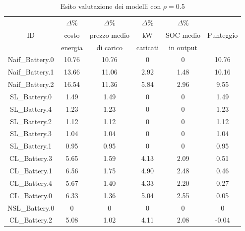 \documentclass[italian, Lau, oneside]{sapthesis}
\begin{document}
\begin{table}[h]
    \center
    \caption{Esito valutazione dei modelli con $\rho = 0.5$}
    \label{tab:scen2}
    \begin{tabular}{c|c|c|c|c|c}
        \hline
        \hline
                & $\Delta \%$   & $\Delta \%$   & $\Delta \%$   & $\Delta \%$   &\\
        ID      & costo         & prezzo medio  & kW            & SOC medio     & Punteggio\\
                & energia       & di carico     & caricati      & in output     & \\

        \hline
        Naif\_Battery.0     & 10.76     & 10.76     & 0     & 0     & 10.76     \\
        \hline
        Naif\_Battery.1     & 13.66     & 11.06     & 2.92  & 1.48  & 10.16     \\
        \hline
        Naif\_Battery.2     & 16.54     & 11.36     & 5.84  & 2.96  & 9.55     \\
        \hline
        SL\_Battery.0       & 1.49      & 1.49      & 0     & 0     & 1.49      \\
        \hline
        SL\_Battery.4       & 1.23      & 1.23      & 0     & 0     & 1.23      \\
        \hline
        SL\_Battery.2       & 1.12      & 1.12      & 0     & 0     & 1.12      \\
        \hline
        SL\_Battery.3       & 1.04      & 1.04      & 0     & 0     & 1.04      \\
        \hline
        SL\_Battery.1       & 0.95      & 0.95      & 0     & 0     & 0.95      \\
        \hline
        CL\_Battery.3       & 5.65      & 1.59      & 4.13  & 2.09  & 0.51      \\
        \hline
        CL\_Battery.1       & 6.56      & 1.75      & 4.90  & 2.48  & 0.46      \\
        \hline
        CL\_Battery.4       & 5.67      & 1.40      & 4.33  & 2.20  & 0.27      \\
        \hline
        CL\_Battery.0       & 6.33      & 1.36      & 5.04  & 2.55  & 0.05      \\
        \hline
        NSL\_Battery.0      & 0         & 0         & 0     & 0     & 0         \\
        \hline
        CL\_Battery.2       & 5.08      & 1.02      & 4.11  & 2.08  & -0.04      \\
        \hline
        \hline
    \end{tabular}
\end{table}
\end{document}
